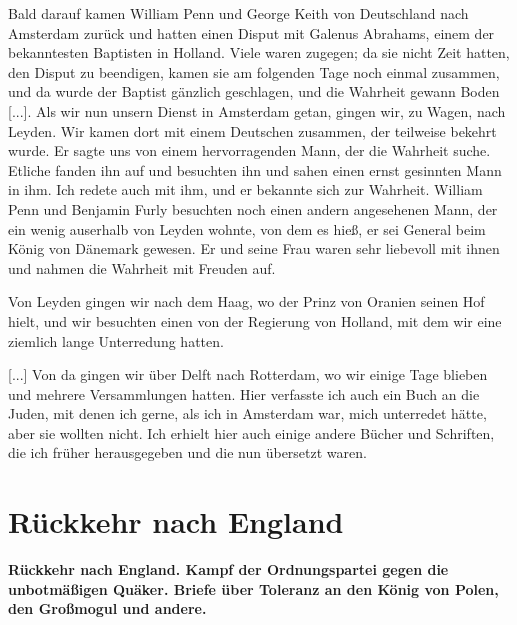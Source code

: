 Bald darauf kamen William Penn 
und George Keith von
Deutschland nach Amsterdam zurück 
und hatten einen Disput mit
Galenus Abrahams, einem 
der bekanntesten Baptisten in Holland.
Viele  waren zugegen; da sie nicht Zeit hatten, den
Disput zu beendigen, kamen sie am folgenden Tage noch einmal
zusammen, und da wurde der Baptist gänzlich geschlagen, und die
Wahrheit gewann Boden [...]. Als wir nun unsern Dienst in
Amsterdam getan, gingen wir, zu Wagen, nach Leyden. Wir
kamen dort mit einem Deutschen zusammen, der teilweise bekehrt
wurde. Er sagte uns von einem hervorragenden Mann, der die
Wahrheit suche. Etliche fanden ihn auf und besuchten ihn und
sahen einen ernst gesinnten Mann in ihm. Ich redete auch mit
ihm, und er bekannte sich zur Wahrheit. William Penn und Benjamin
Furly besuchten noch einen andern 
angesehenen Mann, der ein wenig
auserhalb von Leyden wohnte, von dem es hieß, er sei General
beim König von Dänemark gewesen. Er und seine Frau waren
sehr liebevoll mit ihnen und nahmen die Wahrheit mit Freuden auf.

Von Leyden gingen wir nach dem Haag, wo der Prinz von
Oranien seinen Hof hielt, und 
wir besuchten einen von der Regierung
von Holland, mit dem wir eine ziemlich lange Unterredung hatten.

[...] Von da gingen wir über Delft nach Rotterdam, wo wir
einige Tage blieben und mehrere Versammlungen hatten. Hier
verfasste ich auch ein Buch an die Juden, mit denen ich gerne,
als ich in Amsterdam war, mich unterredet hätte, aber sie wollten
nicht. Ich erhielt hier auch einige andere Bücher und Schriften,
die ich früher herausgegeben und die nun übersetzt waren.

\chapter[Rückkehr nach England]{Rückkehr nach England}

\begin{center}
\textbf{Rückkehr nach England. Kampf der Ordnungspartei gegen die
unbotmäßigen Quäker. Briefe über Toleranz an den König von
Polen, den Großmogul und andere.}
\end{center}


